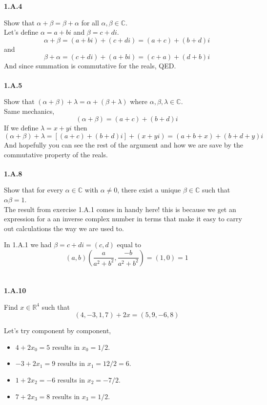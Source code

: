 \textbf{1.A.4}

Show that $\alpha + \beta = \beta + \alpha$ for all $\alpha , \beta \in \mathbb{C}$.
\\

Let's define $\alpha = a + bi$ and $\beta = c + di$.
$$
\alpha + \beta = (a + bi) + (c + di) = (a+c) + (b+d)i
$$
and
$$
\beta + \alpha = (c + di) + (a + bi) = (c+a) + (d+b)i
$$
And since summation is commutative for the reals, QED.
\\~\\



\textbf{1.A.5}

Show that $(\alpha + \beta) + \lambda = \alpha + (\beta + \lambda)$ where $\alpha , \beta , \lambda \in \mathbb{C}$.
\\

Same mechanics,
$$
(\alpha + \beta) = (a+c) + (b+d)i
$$
If we define $\lambda = x + yi$
then
$$
(\alpha + \beta) + \lambda = [(a+c) + (b+d)i] + (x + yi) = (a+b+x) + (b+d+y)i
$$
And hopefully you can see the rest of the argument and how we are save by the commutative property of
the reals.
\\~\\



\textbf{1.A.8}

Show that for every $\alpha \in \mathbb{C}$ with $\alpha \neq 0$, there exist a unique $\beta \in \mathbb{C}$
such that $\alpha \beta = 1$.
\\

The result from exercise 1.A.1 comes in handy here!
this is because we get an expression for a an inverse complex number in terms that make it easy
to carry out calculations the way we are used to.

In 1.A.1 we had $\beta = c + di = (c, d)$ equal to
$$
(a, b)\left( \frac{a}{a^2 + b^2}, \frac{- b}{a^2 + b^2} \right) = (1, 0) = 1
$$
\\~\\


\textbf{1.A.10}

Find $x\in \mathbb{R}^4$ such that
$$
(4, -3, 1, 7) + 2x = (5, 9, -6, 8)
$$

Let's try component by component,
\begin{itemize}
    \item $4 + 2x_0 = 5$ results in $x_0 = 1/2$.
    \item $-3 + 2x_1 = 9$ results in $x_1 = 12/2 = 6$.
    \item $1 + 2x_2 = -6$ results in $x_2 = -7/2$.
    \item $7 + 2x_3 = 8$ results in $x_3 = 1/2$.
\end{itemize}

